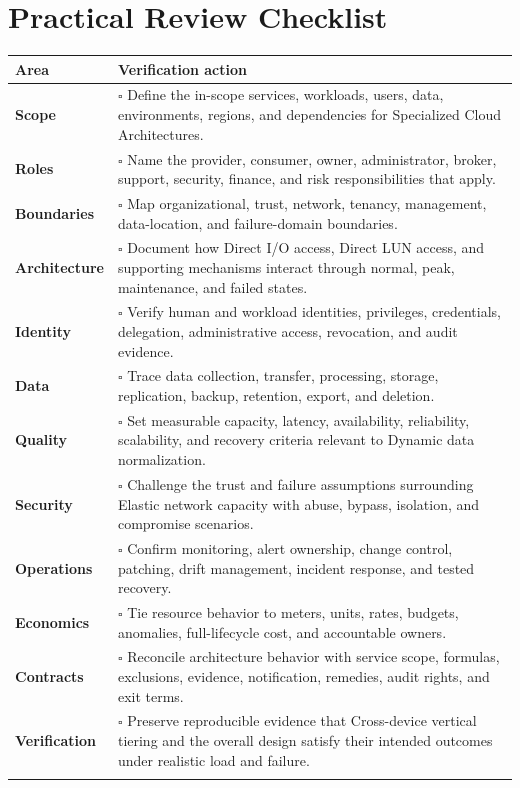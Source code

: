 \documentclass[11pt]{article}
\begin{document}
\section{Practical Review Checklist}
\begin{longtable}{@{}>{\bfseries\color{Teal}}p{}>{\RaggedRight\arraybackslash}p{}@{}}
\toprule\textbf{Area} & \textbf{Verification action}\\\midrule\endhead
Scope & $\square$ Define the in-scope services, workloads, users, data, environments, regions, and dependencies for Specialized Cloud Architectures. \\\addlinespace[2pt]
Roles & $\square$ Name the provider, consumer, owner, administrator, broker, support, security, finance, and risk responsibilities that apply. \\\addlinespace[2pt]
Boundaries & $\square$ Map organizational, trust, network, tenancy, management, data-location, and failure-domain boundaries. \\\addlinespace[2pt]
Architecture & $\square$ Document how Direct I/O access, Direct LUN access, and supporting mechanisms interact through normal, peak, maintenance, and failed states. \\\addlinespace[2pt]
Identity & $\square$ Verify human and workload identities, privileges, credentials, delegation, administrative access, revocation, and audit evidence. \\\addlinespace[2pt]
Data & $\square$ Trace data collection, transfer, processing, storage, replication, backup, retention, export, and deletion. \\\addlinespace[2pt]
Quality & $\square$ Set measurable capacity, latency, availability, reliability, scalability, and recovery criteria relevant to Dynamic data normalization. \\\addlinespace[2pt]
Security & $\square$ Challenge the trust and failure assumptions surrounding Elastic network capacity with abuse, bypass, isolation, and compromise scenarios. \\\addlinespace[2pt]
Operations & $\square$ Confirm monitoring, alert ownership, change control, patching, drift management, incident response, and tested recovery. \\\addlinespace[2pt]
Economics & $\square$ Tie resource behavior to meters, units, rates, budgets, anomalies, full-lifecycle cost, and accountable owners. \\\addlinespace[2pt]
Contracts & $\square$ Reconcile architecture behavior with service scope, formulas, exclusions, evidence, notification, remedies, audit rights, and exit terms. \\\addlinespace[2pt]
Verification & $\square$ Preserve reproducible evidence that Cross-device vertical tiering and the overall design satisfy their intended outcomes under realistic load and failure. \\\addlinespace[2pt]
\bottomrule
\end{longtable}
\end{document}

